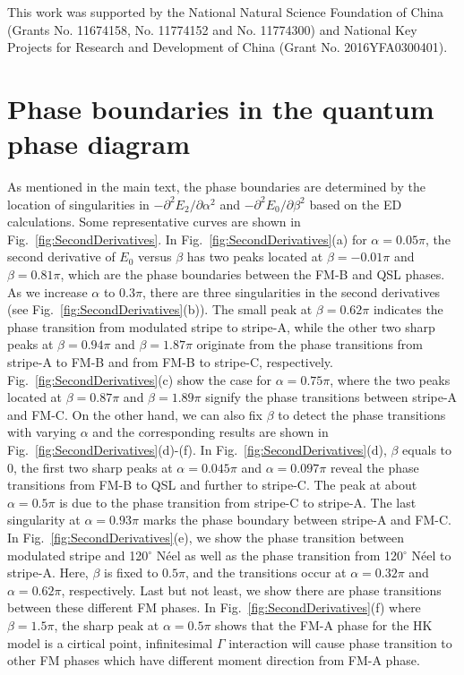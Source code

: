 \documentclass[aps,prb,reprint,amsfonts,amsmath,amssymb,showpacs,groupedaddress,superscriptaddress]{revtex4-1}
\begin{document}
\begin{acknowledgments}
This work was supported by the National Natural Science Foundation of China (Grants No. 11674158, No. 11774152 and No. 11774300) and National Key Projects for Research and Development of China (Grant No. 2016YFA0300401).
\end{acknowledgments}

\appendix

\section{\label{apx:PhaseBoundary}Phase boundaries in the quantum phase diagram}

As mentioned in the main text, the phase boundaries are determined by the location of singularities in $-\partial^{2} E_{2} / \partial \alpha^{2}$ and $-\partial^{2} E_{0} / \partial \beta^{2}$ based on the ED calculations. Some representative curves are shown in Fig.~\ref{fig:SecondDerivatives}. In Fig.~\ref{fig:SecondDerivatives}(a) for $\alpha=0.05\pi$, the second derivative of $E_0$ versus $\beta$ has two peaks located at $\beta=-0.01\pi$ and $\beta=0.81\pi$, which are the phase boundaries between the FM-B and QSL phases. As we increase $\alpha$ to $0.3\pi$, there are three singularities in the second derivatives (see Fig.~\ref{fig:SecondDerivatives}(b)). The small peak at $\beta=0.62\pi$ indicates the phase transition from modulated stripe to stripe-A, while the other two sharp peaks at $\beta=0.94\pi$ and $\beta=1.87\pi$ originate from the phase transitions from stripe-A to FM-B and from FM-B to stripe-C, respectively. Fig.~\ref{fig:SecondDerivatives}(c) show the case for $\alpha=0.75\pi$, where the two peaks located at $\beta=0.87\pi$ and $\beta=1.89\pi$ signify the phase transitions between stripe-A and FM-C. On the other hand, we can also fix $\beta$ to detect the phase transitions with varying $\alpha$ and the corresponding results are shown in Fig.~\ref{fig:SecondDerivatives}(d)-(f). In Fig.~\ref{fig:SecondDerivatives}(d), $\beta$ equals to $0$, the first two sharp peaks at $\alpha=0.045\pi$ and $\alpha=0.097\pi$ reveal the phase transitions from FM-B to QSL and further to stripe-C. The peak at about $\alpha=0.5\pi$ is due to the phase transition from stripe-C to stripe-A. The last singularity at $\alpha=0.93\pi$ marks the phase boundary between stripe-A and FM-C. In Fig.~\ref{fig:SecondDerivatives}(e), we show the phase transition between modulated stripe and 120$^\circ$ N\'{e}el as well as the phase transition from 120$^\circ$ N\'{e}el to stripe-A. Here, $\beta$ is fixed to $0.5\pi$, and the transitions occur at $\alpha=0.32\pi$ and $\alpha=0.62\pi$, respectively. Last but not least, we show there are phase transitions between these different FM phases. In Fig.~\ref{fig:SecondDerivatives}(f) where $\beta=1.5\pi$, the sharp peak at $\alpha=0.5\pi$ shows that the FM-A phase for the HK model is a cirtical point, infinitesimal $\Gamma$ interaction will cause phase transition to other FM phases which have different moment direction from FM-A phase.
\end{document}

